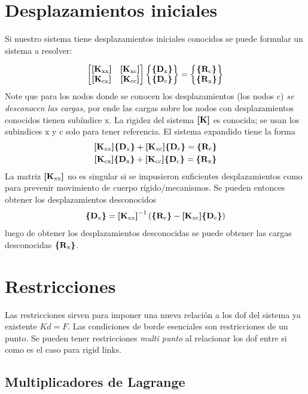 \section{Desplazamientos iniciales} \label{sec:desplzImpuestos}
Si nuestro sistema tiene desplazamientos iniciales conocidos se puede formular un sistema a resolver:

\begin{equation}
	\begin{bmatrix}
	\MKxx & \MKxc \\
	\MKcx & \MKcc
	\end{bmatrix}
	\begin{Bmatrix}
	\CDx \\
	\CDc 
	\end{Bmatrix}
	=	\begin{Bmatrix}
	\CRc \\
	\CRx 
	\end{Bmatrix}
\end{equation} 
Note que para los nodos donde se conocen los desplazamientos (los nodos $\mathrm{c}$) \textit{se desconocen las cargas}, por ende las cargas sobre los nodos con desplazamientos conocidos tienen subíndice $\mathrm{x}$. La rigidez del sistema $\MK{}$ es conocida; se usan los subindices $\mathrm{x}$ y $\mathrm{c}$ solo para tener referencia. El sistema expandido tiene la forma
\begin{gather*} 
	\MKxx \CDx + \MKxc \CDc = \CRc \\
	\MKcx \CDx + \MKcc \CDc = \CRx 
\end{gather*}
La matriz $\MKxx$ no es singular si se impusieron suficientes desplazamientos como para prevenir movimiento de cuerpo rígido/mecanismos. Se pueden entonces obtener los desplazamientos desconocidos
\[
\CDx = \MKxx^{-1} \left( \CRc - \MKxc  \CDc \right)
\]
luego de obtener los desplazamientos desconocidas se puede obtener las cargas desconocidas $\CRx$.



\section{Restricciones}
Las restricciones sirven para imponer una nueva relación a los dof del sistema ya existente $Kd=F$. Las condiciones de borde esenciales son restricciones de un punto. Se pueden tener restricciones \textit{multi punto} al relacionar los dof entre si como es el caso para rigid links.

\subsection*{Multiplicadores de Lagrange}

